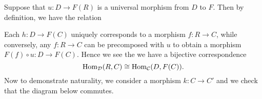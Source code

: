     \begin{prf}
        Suppose that $u: D \to F(R)$ is a universal morphism from $D$ to $F$. 
        Then by definition, we have the relation
        \begin{center}
            \hspace{1cm}
        \end{center} 
        Each $h: D \to F(C)$ uniquely corresponds to 
        a morphism $f: R \to C$, while conversely, any $f: R \to C$ can be precomposed 
        with $u$ to obtain a morphism $F(f) \circ u : D \to F(C)$. Hence we see the 
        we have a bijective correspondence
        \[
            \operatorname{\mathrm{Hom}}_{\mathcal{D}}(R, C) \cong \operatorname{\mathrm{Hom}}_{\mathcal{C}}(D, F(C)).
        \]
        Now to demonstrate naturality, we consider a morphism $k: C \to C'$
        and we check that the diagram below commutes.
        \begin{center}
        \end{center}


\end{prf}
